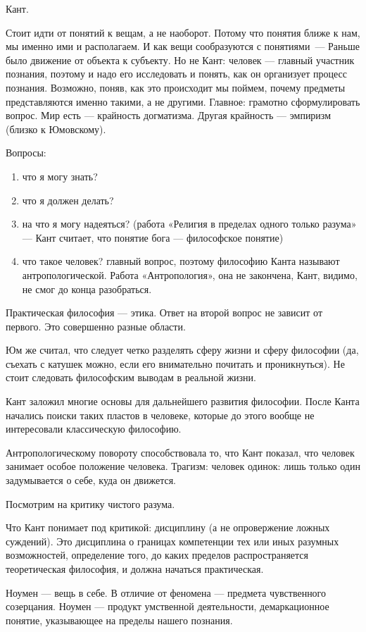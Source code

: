Кант.

Стоит идти от понятий к вещам, а не наоборот. Потому что понятия ближе к нам, мы именно ими и располагаем. И как вещи сообразуются с понятиями~--- Раньше было движение от объекта к субъекту. 
Но не Кант: человек --- главный участник познания, поэтому и надо его исследовать и понять, как он организует процесс познания. 
Возможно, поняв, как это происходит мы поймем, почему предметы представляются именно такими, а не другими. Главное: грамотно сформулировать вопрос.
Мир есть --- крайность догматизма. Другая крайность --- эмпиризм (близко к Юмовскому).

 Вопросы: 
 \begin{enumerate}
 	\item что я могу знать?
 	\item что я должен делать?
 	\item на что я могу надеяться? (работа «Религия в пределах одного только разума» --- Кант считает, что понятие бога --- философское понятие)
 	\item что такое человек? главный вопрос, поэтому философию Канта называют антропологической. Работа «Антропология», она не закончена, Кант, видимо, не смог до конца разобраться.
 \end{enumerate}
 Практическая философия --- этика. Ответ на второй вопрос не зависит от первого. Это совершенно разные области. 

 Юм же считал, что следует четко разделять сферу жизни и сферу философии (да, съехать с катушек можно, если его внимательно почитать и проникнуться). Не стоит следовать философским выводам в реальной жизни.

 Кант заложил многие основы для дальнейшего развития философии. После Канта начались поиски таких пластов в человеке, которые до этого вообще не интересовали классическую философию.

Антропологическому повороту способствовала то, что Кант показал, что человек занимает особое положение человека. Трагизм: человек одинок: лишь только один задумывается о себе, куда он движется. 

Посмотрим на критику чистого разума.

Что Кант понимает под критикой: дисциплину (а не опровержение ложных суждений). 
Это дисциплина о границах компетенции тех или иных разумных возможностей, определение того, до каких пределов распространяется теоретическая философия, и должна начаться практическая.

Ноумен --- вещь в себе. В отличие от феномена --- предмета чувственного созерцания. Ноумен --- продукт умственной деятельности, демаркационное понятие, указывающее на пределы нашего познания. 


